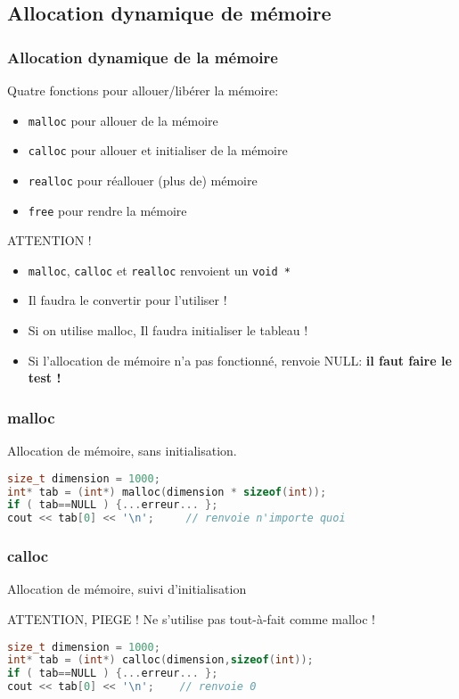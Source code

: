 \documentclass{beamer}
\begin{document}
\subsection{Allocation dynamique de mémoire}

\begin{frame}[fragile=singleslide,shrink=20]
\frametitle{Allocation dynamique de la mémoire}
Quatre fonctions pour allouer/libérer la mémoire:
\begin{itemize}
\item{\texttt{malloc} pour allouer de la mémoire}
\item{\texttt{calloc} pour allouer et initialiser de la mémoire}
\item{\texttt{realloc} pour réallouer (plus de) mémoire}
\item{\texttt{free} pour rendre la mémoire}
\end{itemize}

\begin{block}{ATTENTION !}
\begin{itemize}
\item{\texttt{malloc}, \texttt{calloc} et \texttt{realloc} renvoient un \texttt{void *}}
\item{Il faudra le convertir pour l'utiliser !}
\item{Si on utilise malloc, Il faudra initialiser le tableau !}
\item{Si l'allocation de mémoire n'a pas fonctionné, renvoie NULL: \textbf{il faut faire le test !}}
\end{itemize}
\end{block}
\end{frame}

\begin{frame}[fragile=singleslide,shrink=20]
\frametitle{malloc}
Allocation de mémoire, sans initialisation.

\begin{lstlisting}[language=c++]
size_t dimension = 1000;
int* tab = (int*) malloc(dimension * sizeof(int));
if ( tab==NULL ) {...erreur... };
cout << tab[0] << '\n';     // renvoie n'importe quoi
\end{lstlisting}
\end{frame}

\begin{frame}[fragile=singleslide,shrink=20]
\frametitle{calloc}
Allocation de mémoire, suivi d'initialisation

\begin{block}{ATTENTION, PIEGE !}
Ne s'utilise pas tout-à-fait comme malloc !
\begin{lstlisting}[language=c++]
size_t dimension = 1000;
int* tab = (int*) calloc(dimension,sizeof(int));
if ( tab==NULL ) {...erreur... };
cout << tab[0] << '\n';    // renvoie 0
\end{lstlisting}
\end{block}
\end{frame}
\end{document}
